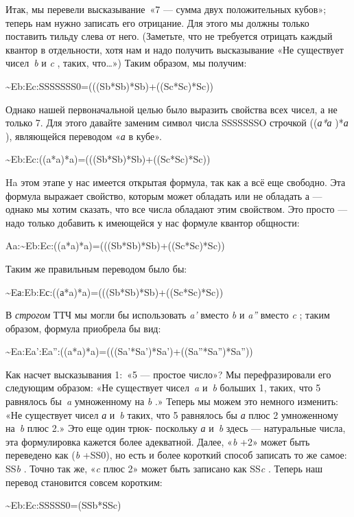 \documentclass[../main.tex]{subfiles}
\begin{document}
Итак, мы перевели высказывание~«7 --- сумма двух положительных кубов»; теперь нам нужно записать его отрицание. Для этого мы должны только поставить тильду слева от него. (Заметьте, что не требуется отрицать каждый квантор в отдельности, хотя нам и надо получить высказывание «Не существует чисел~\emph{b} и \emph{c} , таких, что\ldots») Таким образом, мы получим:

\textasciitilde Eb:Ec:SSSSSSS0=(((Sb*Sb)*Sb)+((Sc*Sc)*Sc))

Однако нашей первоначальной целью было выразить свойства всех чисел, а не только 7. Для этого давайте заменим символ числа SSSSSSSO строчкой ((\emph{а*а} )*\emph{а} ), являющейся переводом «\emph{а} в кубе».

\textasciitilde Eb:Ec:((a*a)*a)=(((Sb*Sb)*Sb)+((Sc*Sc)*Sc))

Ha этом этапе у нас имеется открытая формула, так как $а$ всё еще свободно. Эта формула выражает свойство, которым может обладать или не обладать $а$ --- однако мы хотим сказать, что все числа обладают этим свойством. Это просто --- надо только добавить к имеющейся у нас формуле квантор общности:

Aa:\textasciitilde Eb:Ec:((a*a)*a)=(((Sb*Sb)*Sb)+((Sc*Sc)*Sc))

Таким же правильным переводом было бы:

\textasciitilde Eа:Eb:Eс:((а*a)*a)=(((Sb*Sb)*Sb)+((Sc*Sc)*Sc))

В \emph{строгом} ТТЧ мы могли бы использовать \emph{a'} вместо \emph{b} и \emph{a''} вместо \emph{c} ; таким образом, формула приобрела бы вид:

\textasciitilde Ea:Ea':Ea'':((a*a)*a)=(((Sa'*Sa')*Sa')+((Sa''*Sa'')*Sa''))

Как насчет высказывания 1:~«5 --- простое число»? Мы перефразировали его следующим образом: «Не существует чисел~\emph{a} и~\emph{b} больших 1, таких, что 5 равнялось бы~\emph{a} умноженному на \emph{b} .» Теперь мы можем это немного изменить: «Не существует чисел \emph{а} и~\emph{b} таких, что 5 равнялось бы \emph{а} плюс 2 умноженному на~\emph{b} плюс 2.» Это еще один трюк- поскольку \emph{а} и~\emph{b} здесь --- натуральные числа, эта формулировка кажется более адекватной. Далее, «\emph{b} +2» может быть переведено как (\emph{b} +SS0), но есть и более короткий способ записать то же самое: SS\emph{b} . Точно так же, «\emph{c} плюс 2» может быть записано как SS\emph{c} . Теперь наш перевод становится совсем коротким:

\textasciitilde Eb:Ec:SSSSS0=(SSb*SSc)
\end{document}
